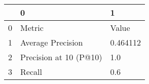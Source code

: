 \begin{tabular}{lll}
\toprule
{} &                       0 &         1 \\
\midrule
0 &                  Metric &     Value \\
1 &       Average Precision &  0.464112 \\
2 &  Precision at 10 (P@10) &       1.0 \\
3 &                  Recall &       0.6 \\
\bottomrule
\end{tabular}
